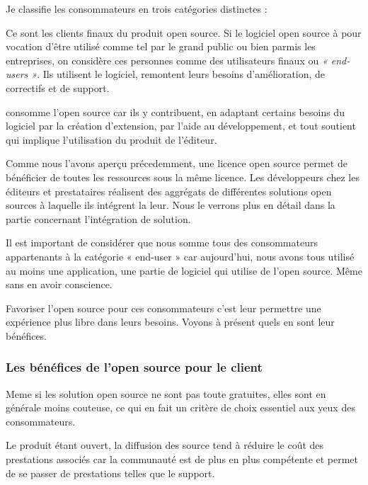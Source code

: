 			Je classifie les consommateurs en trois catégories distinctes :
			\begin{description}[font=\color{burntorange}]
				\item[Les end-users:] Ce sont les clients finaux du produit open source. Si le logiciel open source à pour vocation d'être utilisé comme tel par le grand public ou bien parmis les entreprises, on considère ces personnes comme des utilisateurs finaux ou \textit{« end-users »}. Ils utilisent le logiciel, remontent leurs besoins d'amélioration, de correctifs et de support.
				\item[Les contributeurs et la communauté:] consomme l'open source car ils y contribuent, en adaptant certains besoins du logiciel par la création d'extension, par l'aide au développement, et tout soutient qui implique l'utilisation du produit de l'éditeur.
				\item[Les autres éditeurs et prestataires:] Comme nous l'avons aperçu précedemment, une licence open source permet de bénéficier de toutes les ressources sous la même licence. Les développeurs chez les éditeurs et prestataires réalisent des aggrégats de différentes solutions open sources à laquelle ils intégrent la leur. Nous le verrons plus en détail dans la partie concernant l'intégration de solution.
			\end{description}

			Il est important de considérer que nous somme tous des consommateurs appartenants à la catégorie « end-user » car aujourd'hui, nous avons tous utilisé au moins une application, une partie de logiciel qui utilise de l'open source. Même sans en avoir conscience.

			Favoriser l'open source pour ces consommateurs c'est leur permettre une expérience plus libre dans leurs besoins. Voyons à présent quels en sont leur bénéfices.
			
			\subsubsection{Les bénéfices de l'open source pour le client}

			Meme si les solution open source ne sont pas toute gratuites, elles sont en générale moins couteuse, ce qui en fait un critère de choix essentiel aux yeux des consommateurs.

			Le produit étant ouvert, la diffusion des source tend à réduire le coût des prestations associés car la communauté est de plus en plus compétente et permet de se passer de prestations telles que le support.

